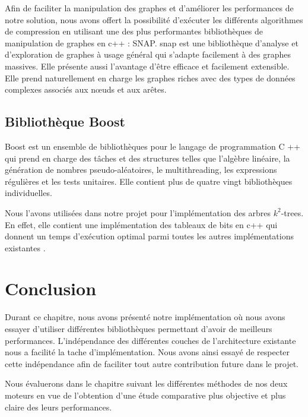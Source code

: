 		Afin de faciliter la manipulation des graphes et d'améliorer les performances de notre solution, nous avons offert la possibilité d'exécuter les différents algorithmes de compression en utilisant une des plus performantes bibliothèques de manipulation de graphes en c++ : SNAP.
		\gls{snap} est une bibliothèque d'analyse et d'exploration de graphes à usage général qui s'adapte facilement à des graphes massives. Elle présente aussi l'avantage d'être  efficace et facilement extensible. Elle prend naturellement en charge les graphes riches avec des types de données complexes associés aux nœuds et aux arêtes. 
		
		\subsection{Bibliothèque Boost}
		

Boost est un ensemble de bibliothèques pour le langage de programmation C ++ qui prend en charge des tâches et des structures telles que l'algèbre linéaire, la génération de nombres pseudo-aléatoires, le multithreading, les expressions régulières et les tests unitaires. Elle contient plus de quatre vingt bibliothèques individuelles.

Nous l'avons utilisées dans notre projet pour l'implémentation des arbres $k^2$-trees. En effet, elle contient une implémentation des tableaux de bits en c++ qui donnent un temps d'exécution optimal parmi toutes les autres implémentations existantes \citep{pieterse2010performance}.  


	\section{Conclusion}
	
Durant ce chapitre, nous avons présenté notre implémentation où nous avons essayer d'utiliser différentes bibliothèques permettant d'avoir de meilleurs performances. L'indépendance des différentes couches de l'architecture existante nous a facilité la tache d'implémentation. Nous avons ainsi essayé de respecter cette indépendance afin de faciliter tout autre contribution future dans le projet. 

Nous évaluerons dans le chapitre suivant les différentes méthodes de nos deux moteurs en vue de l'obtention d'une étude comparative plus objective et plus claire des leurs performances.